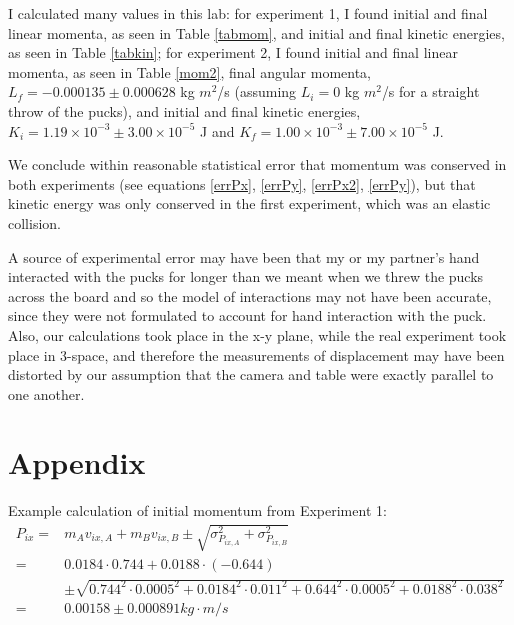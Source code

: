 \documentclass[11pt]{article}
\begin{document}
I calculated many values in this lab: for experiment 1, I found initial and final linear momenta, as seen in Table \ref{tabmom}, and initial and final kinetic energies, as seen in Table \ref{tabkin}; for experiment 2, I found initial and final linear momenta, as seen in Table \ref{mom2}, final angular momenta, $L_f = -0.000135\pm 0.000628$ kg $m^2$/s (assuming $L_i=0$ kg $m^2$/s for a straight throw of the pucks), and initial and final kinetic energies, $K_i = 1.19\times10^{-3} \pm3.00\times10^{-5}$ J and $K_f = 1.00\times10^{-3} \pm7.00\times10^{-5}$ J. 


We conclude within reasonable statistical error that momentum was conserved in both experiments (see equations \ref{errPx}, \ref{errPy}, \ref{errPx2}, \ref{errPy}), but that kinetic energy was only conserved in the first experiment, which was an elastic collision.

A source of experimental error may have been that my or my partner's hand interacted with the pucks for longer than we meant when we threw the pucks across the board and so the model of interactions may not have been accurate, since they were not formulated to account for hand interaction with the puck. Also, our calculations took place in the x-y plane, while the real experiment took place in 3-space, and therefore the measurements of displacement may have been distorted by our assumption that the camera and table were exactly parallel to one another.




\section{Appendix}
Example calculation of initial momentum from Experiment 1:\\
\begin{align*}
P_{ix} =& m_A v_{ix,A} + m_B v_{ix,B} \pm \sqrt{\sigma_{P_{ix,A}}^2+\sigma_{P_{ix,B}}^2} \\
=& 0.0184\cdot0.744 + 0.0188\cdot(-0.644) \\
&\pm \sqrt{0.744^2\cdot0.0005^2+0.0184^2\cdot0.011^2+0.644^2\cdot0.0005^2+0.0188^2\cdot0.038^2} \\
=& 0.00158\pm0.000891 kg\cdot m/s
\end{align*}
\end{document}
